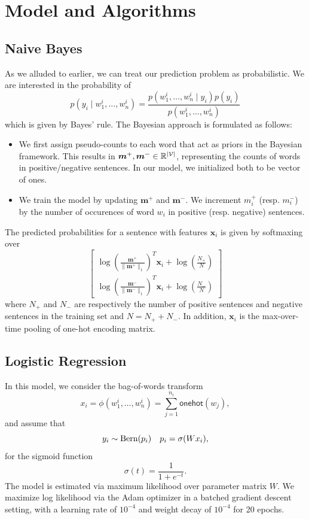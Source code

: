 \documentclass[11pt]{article}
\begin{document}
\section{Model and Algorithms}
\label{sec:models}

\subsection{Naive Bayes}
\label{subsec:nb}

As we alluded to earlier, we can treat our prediction problem as probabilistic. We are interested in the probability of
\[
  p(y_i \mid w_1^i, \dots, w_n^i) = \frac{p(w_1^i, \dots, w_n^i \mid y_i) p(y_i)}{p(w_1^i, \dots, w_n^i)}
\]
which is given by Bayes' rule. The Bayesian approach is formulated as follows:
\newcommand{\bdm}{\bm{m}}
\begin{itemize}
  \item We first assign pseudo-counts to each word that act as priors in the Bayesian framework. This results in $\bdm^+, \bdm^- \in \mathbb{R}^{|\mcV|}$, representing the counts of words in positive/negative sentences. In our model, we initialized both to be vector of ones.
  \item We train the model by updating $\bdm^+$ and $\bdm^-$. We increment $m^+_i$ (resp. $m^-_i$) by the number of occurences of word $w_i$ in positive (resp. negative) sentences.
\end{itemize}
The predicted probabilities for a sentence with features $\bm x_i$ is given by softmaxing over
\[
  \begin{bmatrix}
    \log \left( \frac{\bdm^+}{\|\bdm^+\|_1} \right)^T \bm x_i + \log \left( \frac{N_+}{N} \right)\\
    \log \left( \frac{\bdm^-}{\|\bdm^-\|_1} \right)^T \bm x_i + \log \left( \frac{N_-}{N} \right)
  \end{bmatrix}
\]
where $N_+$ and $N_-$ are respectively the number of positive sentences and negative sentences in the training set and $N = N_+ + N_-$. In addition, $\bm x_i$ is the max-over-time pooling of one-hot encoding matrix.

\subsection{Logistic Regression}
\label{subsec:logistic}

In this model,  we consider the bag-of-words transform \[x_i = \phi
(w_1^i,\ldots,w_n^i) =
\sum_{j=1}^{n_i} \mathsf{onehot}(w_j),\] and assume that \[
y_i \sim \operatorname{Bern}(p_i) \quad p_i = \sigma(Wx_i),
\]
for the sigmoid function \[
\sigma(t) = \frac{1}{1+e^{-t}}. 
\]
The model is estimated via maximum likelihood over parameter matrix $W$. We
maximize log likelihood via the Adam optimizer in a batched gradient descent
setting, with a learning rate of $10^{-4}$
and weight decay of $10^{-4}$ for 20 epochs. 
\end{document}
